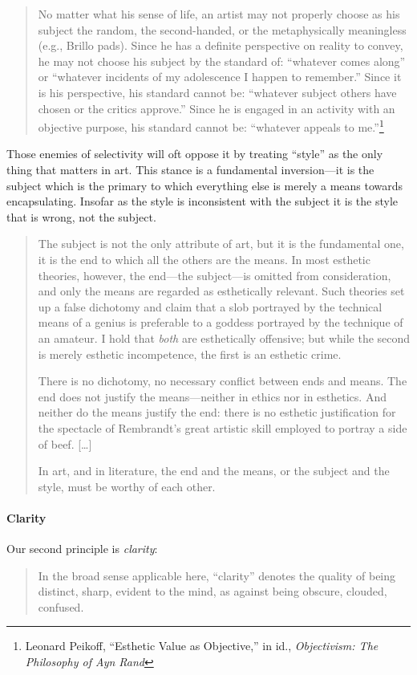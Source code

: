\documentclass[11pt]{article}
\begin{document}
\begin{quote}
No matter what his sense of life, an artist may not properly choose as his subject the random, the second-handed, or the metaphysically meaningless (e.g., Brillo pads). Since he has a definite perspective on reality to convey, he may not choose his subject by the standard of: ``whatever comes along'' or ``whatever incidents of my adolescence I happen to remember.'' Since it is his perspective, his standard cannot be: ``whatever subject others have chosen or the critics approve.'' Since he is engaged in an activity with an objective purpose, his standard cannot be: ``whatever appeals to me.''\footnote{Leonard Peikoff, ``Esthetic Value as Objective,'' in id., \emph{Objectivism: The Philosophy of Ayn Rand}}
\end{quote}

Those enemies of selectivity will oft oppose it by treating ``style'' as the only thing that matters in art. This stance is a fundamental inversion---it is the subject which is the primary to which everything else is merely a means towards encapsulating. Insofar as the style is inconsistent with the subject it is the style that is wrong, not the subject.

\begin{quote}
The subject is not the only attribute of art, but it is the fundamental one, it is the end to which all the others are the means. In most esthetic theories, however, the end—the subject—is omitted from consideration, and only the means are regarded as esthetically relevant. Such theories set up a false dichotomy and claim that a slob portrayed by the technical means of a genius is preferable to a goddess portrayed by the technique of an amateur. I hold that \emph{both} are esthetically offensive; but while the second is merely esthetic incompetence, the first is an esthetic crime.

There is no dichotomy, no necessary conflict between ends and means. The end does not justify the means—neither in ethics nor in esthetics. And neither do the means justify the end: there is no esthetic justification for the spectacle of Rembrandt's great artistic skill employed to portray a side of beef. [\ldots{}]

In art, and in literature, the end and the means, or the subject and the style, must be worthy of each other.
\end{quote}

\paragraph*{Clarity}
\label{sec:orgf383a8b}
Our second principle is \emph{clarity}:
\begin{quote}
In the broad sense applicable here, ``clarity'' denotes the quality of being distinct, sharp, evident to the mind, as against being obscure, clouded, confused.
\end{quote}
\end{document}

